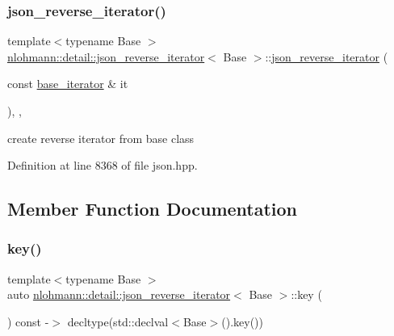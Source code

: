 \subsubsection{\texorpdfstring{json\_reverse\_iterator()}{json\_reverse\_iterator()}\hspace{0.1cm}{\footnotesize\ttfamily [2/2]}}
{\footnotesize\ttfamily template$<$typename Base $>$ \\
\mbox{\hyperlink{classnlohmann_1_1detail_1_1json__reverse__iterator}{nlohmann\+::detail\+::json\+\_\+reverse\+\_\+iterator}}$<$ Base $>$\+::\mbox{\hyperlink{classnlohmann_1_1detail_1_1json__reverse__iterator}{json\+\_\+reverse\+\_\+iterator}} (\begin{DoxyParamCaption}\item[{const \mbox{\hyperlink{classnlohmann_1_1detail_1_1json__reverse__iterator_a6b2ef1d632fe49bfcc22fbd1abd62395}{base\+\_\+iterator}} \&}]{it }\end{DoxyParamCaption})\hspace{0.3cm}{\ttfamily [inline]}, {\ttfamily [explicit]}, {\ttfamily [noexcept]}}



create reverse iterator from base class 



Definition at line 8368 of file json.\+hpp.



\subsection{Member Function Documentation}
\mbox{\label{classnlohmann_1_1detail_1_1json__reverse__iterator_adc648a641e8e9a1072c5abd56ad06401}} 
\subsubsection{\texorpdfstring{key()}{key()}}
{\footnotesize\ttfamily template$<$typename Base $>$ \\
auto \mbox{\hyperlink{classnlohmann_1_1detail_1_1json__reverse__iterator}{nlohmann\+::detail\+::json\+\_\+reverse\+\_\+iterator}}$<$ Base $>$\+::key (\begin{DoxyParamCaption}{ }\end{DoxyParamCaption}) const -\/$>$ decltype(std\+::declval$<$Base$>$().key())
    \hspace{0.3cm}{\ttfamily [inline]}}



